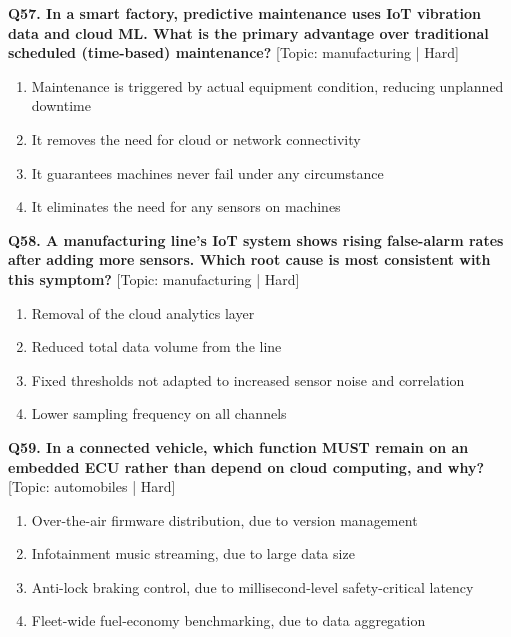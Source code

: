 \noindent\textbf{Q57. In a smart factory, predictive maintenance uses IoT vibration data and cloud ML. What is the primary advantage over traditional scheduled (time-based) maintenance?} \hfill [Topic: manufacturing | Hard]
\begin{enumerate}[label=(\alph*),topsep=2pt,itemsep=1pt,partopsep=0pt,parsep=0pt]
    \item {Maintenance is triggered by actual equipment condition, reducing unplanned downtime}
    \item {It removes the need for cloud or network connectivity}
    \item {It guarantees machines never fail under any circumstance}
    \item {It eliminates the need for any sensors on machines}
\end{enumerate}
\vspace{2mm}

\noindent\textbf{Q58. A manufacturing line's IoT system shows rising false-alarm rates after adding more sensors. Which root cause is most consistent with this symptom?} \hfill [Topic: manufacturing | Hard]
\begin{enumerate}[label=(\alph*),topsep=2pt,itemsep=1pt,partopsep=0pt,parsep=0pt]
    \item {Removal of the cloud analytics layer}
    \item {Reduced total data volume from the line}
    \item {Fixed thresholds not adapted to increased sensor noise and correlation}
    \item {Lower sampling frequency on all channels}
\end{enumerate}
\vspace{2mm}

\noindent\textbf{Q59. In a connected vehicle, which function MUST remain on an embedded ECU rather than depend on cloud computing, and why?} \hfill [Topic: automobiles | Hard]
\begin{enumerate}[label=(\alph*),topsep=2pt,itemsep=1pt,partopsep=0pt,parsep=0pt]
    \item {Over-the-air firmware distribution, due to version management}
    \item {Infotainment music streaming, due to large data size}
    \item {Anti-lock braking control, due to millisecond-level safety-critical latency}
    \item {Fleet-wide fuel-economy benchmarking, due to data aggregation}
\end{enumerate}
\vspace{2mm}

